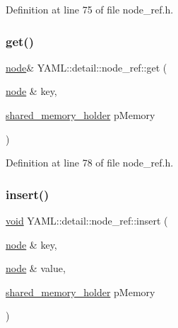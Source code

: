 Definition at line 75 of file node\+\_\+ref.\+h.

\mbox{\label{class_y_a_m_l_1_1detail_1_1node__ref_a138908b9ef548bc8958475c12ee977a6}} 
\subsubsection{\texorpdfstring{get()}{get()}\hspace{0.1cm}{\footnotesize\ttfamily [4/4]}}
{\footnotesize\ttfamily \mbox{\hyperlink{class_y_a_m_l_1_1detail_1_1node}{node}}\& Y\+A\+M\+L\+::detail\+::node\+\_\+ref\+::get (\begin{DoxyParamCaption}\item[{\mbox{\hyperlink{class_y_a_m_l_1_1detail_1_1node}{node}} \&}]{key,  }\item[{\mbox{\hyperlink{namespace_y_a_m_l_1_1detail_a228c4b3b6ba1058b474d40afc218e21d}{shared\+\_\+memory\+\_\+holder}}}]{p\+Memory }\end{DoxyParamCaption})\hspace{0.3cm}{\ttfamily [inline]}}



Definition at line 78 of file node\+\_\+ref.\+h.

\mbox{\label{class_y_a_m_l_1_1detail_1_1node__ref_a0925bb1842e980b6fc17ff0c3e654251}} 
\subsubsection{\texorpdfstring{insert()}{insert()}}
{\footnotesize\ttfamily \mbox{\hyperlink{glad_8h_a950fc91edb4504f62f1c577bf4727c29}{void}} Y\+A\+M\+L\+::detail\+::node\+\_\+ref\+::insert (\begin{DoxyParamCaption}\item[{\mbox{\hyperlink{class_y_a_m_l_1_1detail_1_1node}{node}} \&}]{key,  }\item[{\mbox{\hyperlink{class_y_a_m_l_1_1detail_1_1node}{node}} \&}]{value,  }\item[{\mbox{\hyperlink{namespace_y_a_m_l_1_1detail_a228c4b3b6ba1058b474d40afc218e21d}{shared\+\_\+memory\+\_\+holder}}}]{p\+Memory }\end{DoxyParamCaption})\hspace{0.3cm}{\ttfamily [inline]}}



